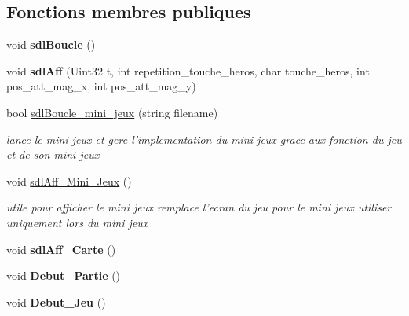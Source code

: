 \subsection*{Fonctions membres publiques}
\begin{DoxyCompactItemize}
\item 
\hypertarget{classsdlJeu_a5628835d7efcab056985c3aa3de56836}{void {\bfseries sdl\+Boucle} ()}\label{classsdlJeu_a5628835d7efcab056985c3aa3de56836}

\item 
\hypertarget{classsdlJeu_a191a69d298516350413d423e369d7441}{void {\bfseries sdl\+Aff} (Uint32 t, int repetition\+\_\+touche\+\_\+heros, char touche\+\_\+heros, int pos\+\_\+att\+\_\+mag\+\_\+x, int pos\+\_\+att\+\_\+mag\+\_\+y)}\label{classsdlJeu_a191a69d298516350413d423e369d7441}

\item 
\hypertarget{classsdlJeu_a7cb710d23f671ff25c3a580d3096d7b2}{bool \hyperlink{classsdlJeu_a7cb710d23f671ff25c3a580d3096d7b2}{sdl\+Boucle\+\_\+mini\+\_\+jeux} (string filename)}\label{classsdlJeu_a7cb710d23f671ff25c3a580d3096d7b2}

\begin{DoxyCompactList}\small\item\em lance le mini jeux et gere l'implementation du mini jeux grace aux fonction du jeu et de son mini jeux \end{DoxyCompactList}\item 
\hypertarget{classsdlJeu_a06c22d82de799ed5ccb2acaae8a455dc}{void \hyperlink{classsdlJeu_a06c22d82de799ed5ccb2acaae8a455dc}{sdl\+Aff\+\_\+\+Mini\+\_\+\+Jeux} ()}\label{classsdlJeu_a06c22d82de799ed5ccb2acaae8a455dc}

\begin{DoxyCompactList}\small\item\em utile pour afficher le mini jeux remplace l'ecran du jeu pour le mini jeux utiliser uniquement lors du mini jeux \end{DoxyCompactList}\item 
\hypertarget{classsdlJeu_a2226b2a21cb5999910064eabb7614e09}{void {\bfseries sdl\+Aff\+\_\+\+Carte} ()}\label{classsdlJeu_a2226b2a21cb5999910064eabb7614e09}

\item 
\hypertarget{classsdlJeu_aea5b57a26f7744c38188625944e1e8df}{void {\bfseries Debut\+\_\+\+Partie} ()}\label{classsdlJeu_aea5b57a26f7744c38188625944e1e8df}

\item 
\hypertarget{classsdlJeu_a911fea9f2be914325d94a78c16691ea7}{void {\bfseries Debut\+\_\+\+Jeu} ()}\label{classsdlJeu_a911fea9f2be914325d94a78c16691ea7}

\end{DoxyCompactItemize}
